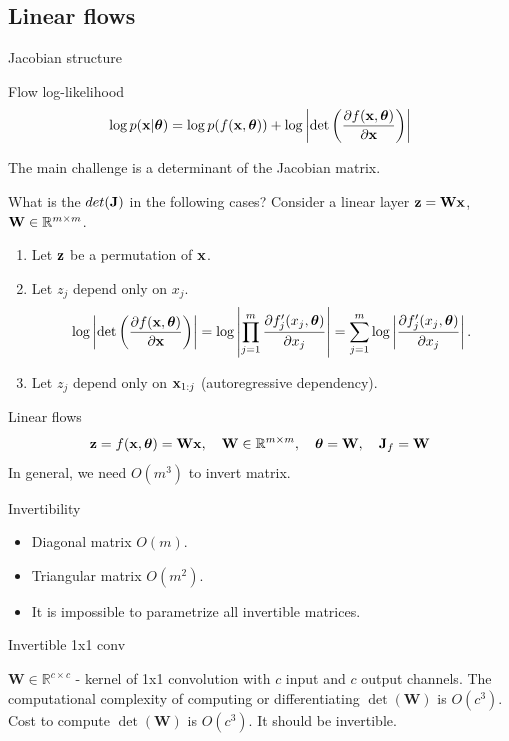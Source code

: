 \subsection{Linear flows}
\begin{frame}{Jacobian structure}
	\begin{block}{Flow log-likelihood}
		\[
			\log p(\mathbf{x}|\boldsymbol{\theta}) = \log p(f(\mathbf{x}, \boldsymbol{\theta})) + \log \left|\det \left( \frac{\partial f(\mathbf{x}, \boldsymbol{\theta})}{\partial \mathbf{x}} \right) \right|
		\]
	\end{block}
	The main challenge is a determinant of the Jacobian matrix.
	\begin{block}{What is the $det(\mathbf{J})$ in the following cases?}
		Consider a linear layer $\mathbf{z} = \mathbf{W} \mathbf{x}$, $\mathbf{W} \in \mathbb{R}^{m \times m}$.
		\begin{enumerate}
			\item Let $\mathbf{z}$ be a permutation of $\mathbf{x}$. 
			\item Let $z_j$ depend only on $x_j$. 
			\[
				\log \left|\det \left( \frac{\partial f(\mathbf{x}, \boldsymbol{\theta})}{\partial \mathbf{x}} \right) \right| = \log \left| \prod_{j=1}^m \frac{\partial f_j'(x_j, \boldsymbol{\theta})}{\partial x_j} \right| = \sum_{j=1}^m \log \left|  \frac{\partial f_j'(x_j, \boldsymbol{\theta})}{\partial x_j} \right|.
			\]
			\item Let $z_j$ depend only on $\mathbf{x}_{1:j}$ (autoregressive dependency). 
		\end{enumerate}
	\end{block}
\end{frame}
\begin{frame}{Linear flows}
	\[
		\mathbf{z} = f(\mathbf{x}, \boldsymbol{\theta}) = \mathbf{W} \mathbf{x}, \quad \mathbf{W} \in \mathbb{R}^{m \times m}, \quad \boldsymbol{\theta} = \mathbf{W}, \quad \mathbf{J}_f = \mathbf{W}
	\]
	In general, we need $O(m^3)$ to invert matrix.
	\begin{block}{Invertibility}
		\begin{itemize}
			\item Diagonal matrix $O(m)$.
			\item Triangular matrix $O(m^2)$.
			\item It is impossible to parametrize all invertible matrices.
		\end{itemize}
	\end{block}
	\begin{block}{Invertible 1x1 conv}
			
		$\mathbf{W} \in \mathbb{R}^{c \times c}$ - kernel of 1x1 convolution with $c$ input and $c$ output channels.
		The computational complexity of computing or differentiating $\det (\mathbf{W})$ is $O(c^3)$.
		Cost to compute $\det (\mathbf{W})$ is $O(c^3)$. It should be invertible.
	\end{block}
	
\end{frame}
